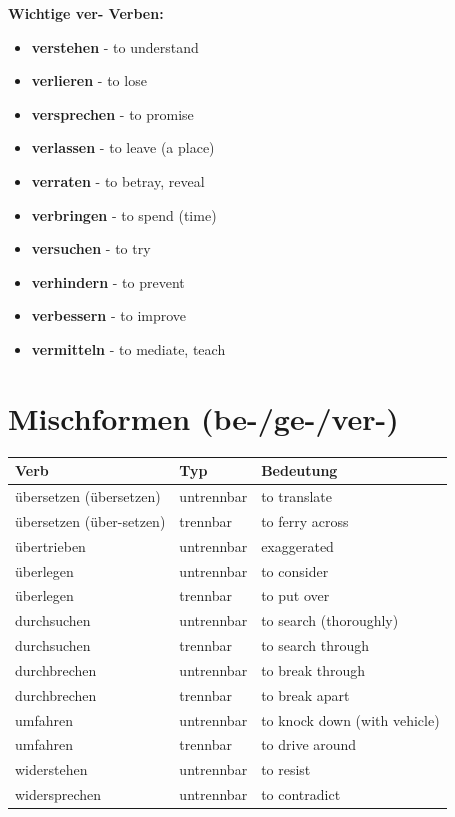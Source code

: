 \bigskip
\noindent\textbf{Wichtige ver- Verben:}

\begin{itemize}
    \item \textbf{verstehen} - to understand
    \item \textbf{verlieren} - to lose
    \item \textbf{versprechen} - to promise
    \item \textbf{verlassen} - to leave (a place)
    \item \textbf{verraten} - to betray, reveal
    \item \textbf{verbringen} - to spend (time)
    \item \textbf{versuchen} - to try
    \item \textbf{verhindern} - to prevent
    \item \textbf{verbessern} - to improve
    \item \textbf{vermitteln} - to mediate, teach
\end{itemize}

\section{Mischformen (be-/ge-/ver-)}
\label{sec:Mischformen}

\bigskip
\begin{center}
\begin{tabular}{|l|l|p{6cm}|}
\hline
Verb & Typ & Bedeutung \\ \hline
übersetzen (übersetzen) & untrennbar & to translate \\ \hline
übersetzen (über-setzen) & trennbar & to ferry across \\ \hline
übertrieben & untrennbar & exaggerated \\ \hline
überlegen & untrennbar & to consider \\ \hline
überlegen & trennbar & to put over \\ \hline
durchsuchen & untrennbar & to search (thoroughly) \\ \hline
durchsuchen & trennbar & to search through \\ \hline
durchbrechen & untrennbar & to break through \\ \hline
durchbrechen & trennbar & to break apart \\ \hline
umfahren & untrennbar & to knock down (with vehicle) \\ \hline
umfahren & trennbar & to drive around \\ \hline
widerstehen & untrennbar & to resist \\ \hline
widersprechen & untrennbar & to contradict \\ \hline
\end{tabular}
\end{center}

